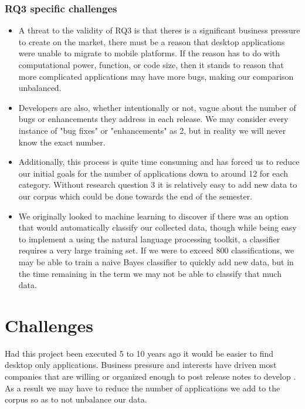 \documentclass{acm_proc_article-sp}
\begin{document}
\subsubsection{RQ3 specific challenges}
\begin{itemize}


\item A threat to the validity of RQ3 is that theres is a significant business pressure to create \sibs on the market, there must be a reason that desktop applications were unable to migrate to mobile platforms. 
If the reason has to do with computational power, function, or code size, then it stands to reason that more complicated applications may have more bugs, making our comparison unbalanced.

\item Developers are also, whether intentionally or not, vague about the number of bugs or enhancements they address in each release. 
We may consider every instance of "bug fixes" or "enhancements" as 2, but in reality we will never know the exact number.

\item Additionally, this process is quite time consuming and has forced us to reduce our initial goals for the number of applications down to around 12 for each category.
Without research question 3 it is relatively easy to add new data to our corpus which could be done towards the end of the semester.

\item We originally looked to machine learning to discover if there was an option that would automatically classify our collected data, though while being easy to implement a using the natural language processing toolkit, a classifier requires a very large training set.
If we were to exceed 800 classifications, we may be able to train a naive Bayes classifier to quickly add new data, but in the time remaining in the term we may not be able to classify that much data.

\end{itemize}

\section{Challenges}
Had this project been executed 5 to 10 years ago it would be easier to find desktop only applications. 
Business pressure and interests have driven most companies that are willing or organized enough to post release notes to develop \sibs. 
As a result we may have to reduce the number of applications we add to the corpus so as to not unbalance our data.
\end{document}
